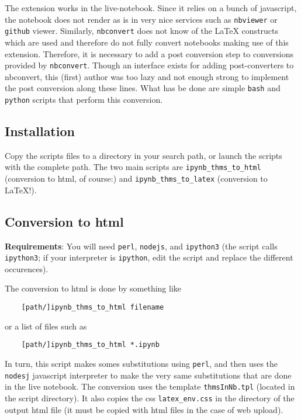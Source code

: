     The extension works in the live-notebook. Since it relies on a bunch of
javascript, the notebook does not render as is in very nice services
such as \texttt{nbviewer} or \texttt{github} viewer. Similarly,
\texttt{nbconvert} does not know of the LaTeX constructs which are used
and therefore do not fully convert notebooks making use of this
extension. Therefore, it is necessary to add a post conversion step to
conversions provided by \texttt{nbconvert}. Though an interface exists
for adding post-converters to nbconvert, this (first) author was too
lazy and not enough strong to implement the post conversion along these
lines. What has be done are simple \texttt{bash} and \texttt{python}
scripts that perform this conversion.

    \subsection{Installation}\label{installation}

    Copy the scripts files to a directory in your search path, or launch the
scripts with the complete path. The two main scripts are
\texttt{ipynb\_thms\_to\_html} (conversion to html, of course:) and
\texttt{ipynb\_thms\_to\_latex} (conversion to LaTeX!).

    \subsection{Conversion to html}\label{conversion-to-html}

    \textbf{Requirements}: You will need \texttt{perl}, \texttt{nodejs}, and
\texttt{ipython3} (the script calls \texttt{ipython3}; if your
interpreter is \texttt{ipython}, edit the script and replace the
different occurences).

The conversion to html is done by something like

\begin{verbatim}
    [path/]ipynb_thms_to_html filename
\end{verbatim}

or a list of files such as

\begin{verbatim}
    [path/]ipynb_thms_to_html *.ipynb
\end{verbatim}

In turn, this script makes somes substitutions using \texttt{perl}, and
then uses the \texttt{nodesj} javascript interpreter to make the very
same substitutions that are done in the live notebook. The conversion
uses the template \texttt{thmsInNb.tpl} (located in the script
directory). It also copies the css \texttt{latex\_env.css} in the
directory of the output html file (it must be copied with html files in
the case of web upload).


